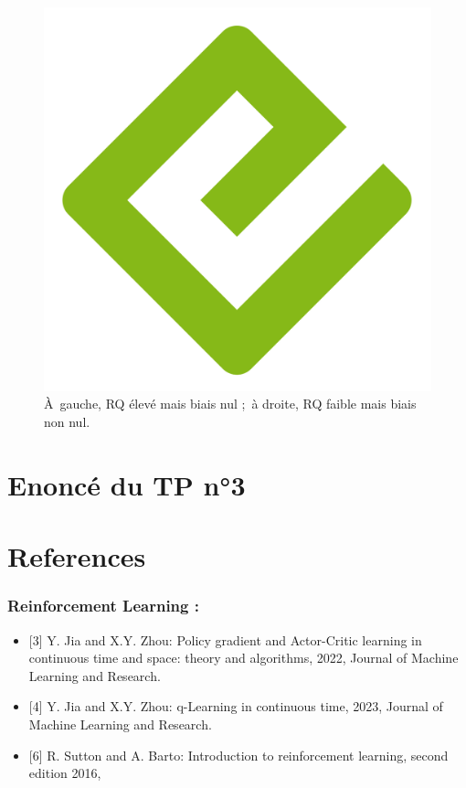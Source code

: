 \documentclass[
  10,
  letterpaper,
  DIV=11,
  numbers=noendperiod]{scrreport}
\newlength{\cslhangindent}
\newenvironment{CSLReferences}[2] %
 {\begin{list}{}{%
  \setlength{\itemindent}{0pt}
  \setlength{\leftmargin}{0pt}
  \setlength{\parsep}{0pt}
  \ifodd #1
   \setlength{\leftmargin}{\cslhangindent}
   \setlength{\itemindent}{-1\cslhangindent}
  \fi
  \setlength{\itemsep}{#2\baselineskip}}}
 {\end{list}}
\theoremstyle{definition}
\theoremstyle{remark}
\begin{document}
\begin{figure}[H]

{\centering \includegraphics[width=0.5\linewidth,height=\textheight,keepaspectratio]{images/cover.png}

}

\caption{À~gauche, RQ élevé mais biais nul ;~à droite, RQ faible mais
biais non nul.}

\end{figure}%

\chapter{Enoncé du TP n°3}\label{enoncuxe9-du-tp-n3}


\chapter*{References}\label{references}


\label{refs}
\begin{CSLReferences}{0}{1}
\end{CSLReferences}

\subsection*{Reinforcement Learning :}\label{reinforcement-learning}

\begin{itemize}
\item
  {[}3{]} Y. Jia and X.Y. Zhou: Policy gradient and Actor-Critic
  learning in continuous time and space: theory and algorithms, 2022,
  Journal of Machine Learning and Research.
\item
  {[}4{]} Y. Jia and X.Y. Zhou: q-Learning in continuous time, 2023,
  Journal of Machine Learning and Research.
\item
  {[}6{]} R. Sutton and A. Barto: Introduction to reinforcement
  learning, second edition 2016,
\end{itemize}
\end{document}

